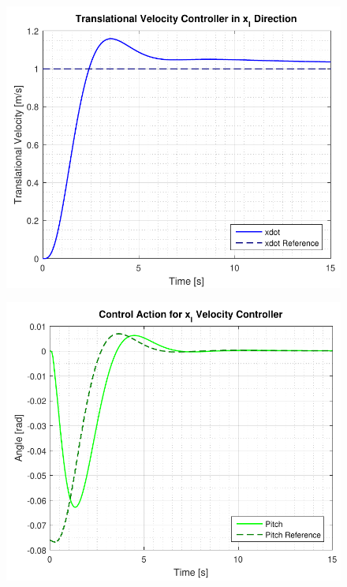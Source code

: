 \begin{minipage}{\linewidth}
    \begin{minipage}{0.46\linewidth}
        \begin{figure}[H]
            \includegraphics[scale=.5]{figures/velocityControllersXY}
            \centering			
            \label{fig:velocityControllersXY}
        \end{figure}
    \end{minipage}
    \hspace{0.03\linewidth}
    \begin{minipage}{0.46\linewidth}
        \begin{figure}[H]
            \includegraphics[scale=.5]{figures/velocityControllersXYAction}

\end{figure}
\end{minipage}
\end{minipage}
